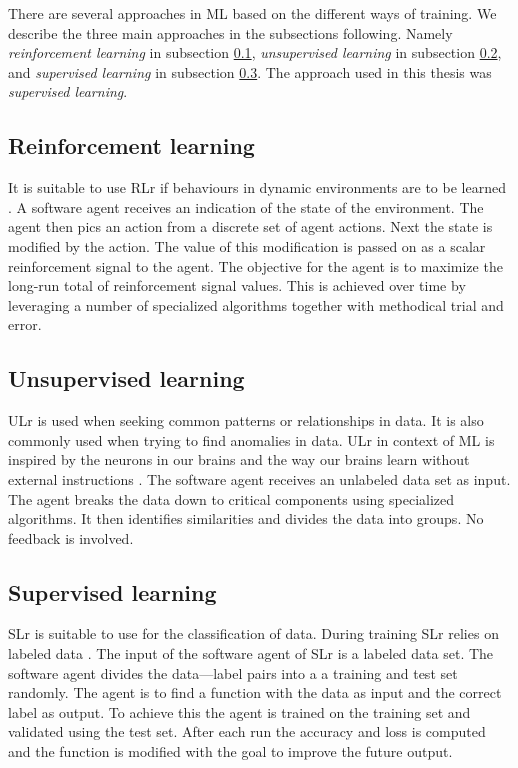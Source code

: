 There are several approaches in ML based on the different ways of training. We describe the three main approaches in the subsections following. Namely \textit{reinforcement learning} in subsection \ref{reinforcementLearning}, \textit{unsupervised learning} in subsection \ref{unsupervisedLearning}, and \textit{supervised learning} in subsection \ref{supervisedLearning}. The approach used in this thesis was \textit{supervised learning}. 

\subsection{Reinforcement learning} \label{reinforcementLearning}
It is suitable to use RLr if behaviours in dynamic environments are to be learned \cite{reinforcementLearningIntroduction}. A software agent receives an indication of the state of the environment. The agent then pics an action from a discrete set of agent actions. Next the state is modified by the action. The value of this modification is passed on as a scalar reinforcement signal to the agent. The objective for the agent is to maximize the long-run total of reinforcement signal values. This is achieved over time by leveraging a number of specialized algorithms together with methodical trial and error.

\subsection{Unsupervised learning} \label{unsupervisedLearning}
 ULr is used when seeking common patterns or relationships in data. It is also commonly used when trying to find anomalies in data. ULr in context of ML is inspired by the neurons in our brains and the way our brains learn without external instructions \cite{unsupervisedLearningIntroduction}. The software agent receives an unlabeled data set as input. The agent breaks the data down to critical components using specialized algorithms. It then identifies similarities and divides the data into groups. No feedback is involved.

\subsection{Supervised learning} \label{supervisedLearning}
SLr is suitable to use for the classification of data. During training SLr relies on labeled data \cite{machineLeraningApproaches}. The input of the software agent of SLr is a labeled data set. The software agent divides the data---label pairs into a a training and test set randomly. The agent is to find a function with the data as input and the correct label as output. To achieve this the agent is trained on the training set and validated using the test set. After each run the accuracy and loss is computed and the function is modified with the goal to improve the future output. 

